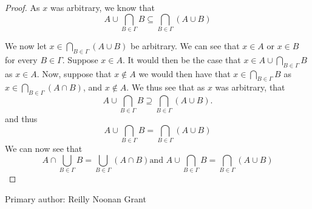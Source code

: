 \begin{proof}
    As $x$ was arbitrary, we know that 
    $$
        A \cup \bigcap_{B\in \Gamma} B \subseteq \bigcap_{B\in \Gamma} (A \cup B)
    $$

    We now let $x \in \bigcap_{B\in \Gamma} (A \cup B)$ be arbitrary.
    We can see
    that $x \in A$ or $x \in B$ for every $B \in \Gamma$.  Suppose $x
    \in A$. It would then be the case that $x \in A \cup
    \bigcap_{B\in\Gamma} B$ as $x \in A$.
    Now, suppose that $x \notin A$ we would then have that $x \in
    \bigcap_{B\in\Gamma} B$ as $x \in \bigcap_{B\in\Gamma} (A \cap B)$, and $x
    \notin A$. We thus see that as $x$ was arbitrary, that 
    $$
        A \cup \bigcap_{B\in \Gamma} B \supseteq \bigcap_{B\in \Gamma} (A \cup
        B).
    $$
    and thus 
    $$
        A \cup \bigcap_{B\in \Gamma} B = \bigcap_{B\in \Gamma} (A \cup B)
    $$
    We can now see that
    $$
        A \cap  \bigcup_{B\in \Gamma} B = \bigcup_{B\in \Gamma} (A \cap B)\text{
        and  } A \cup \bigcap_{B\in \Gamma} B = \bigcap_{B\in \Gamma} (A \cup B)
    $$

\end{proof}
Primary author: Reilly Noonan Grant